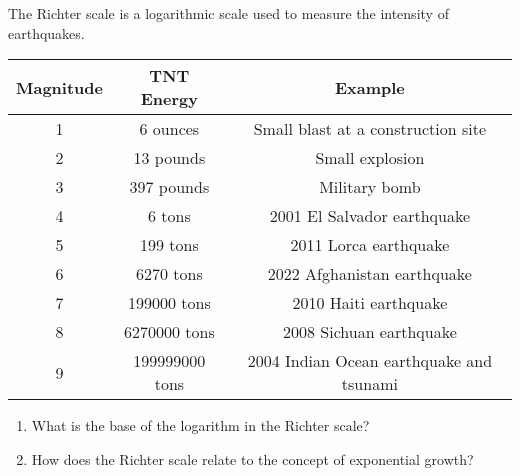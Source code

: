 \documentclass[noauthor,nooutcomes,handout,hints,12pt]{ximera}
\begin{document}
\begin{question}
The Richter scale is a logarithmic scale used to measure the
intensity of earthquakes.
\begin{center}%
    \begin{tabular}{|c|c|c|}\hline
        \textbf{Magnitude} & \textbf{TNT Energy} & \textbf{Example}                   \\\hline
        1                  & 6 ounces            & Small blast at a construction site \\\hline
        2                  & 13 pounds           & Small explosion                    \\\hline
        3                  & 397 pounds          & Military bomb                      \\\hline
        4                  & 6 tons              & 2001 El Salvador earthquake        \\\hline
        5                  & 199 tons            & 2011 Lorca earthquake              \\\hline
        6                  & 6270 tons           & 2022 Afghanistan earthquake        \\\hline
        7                  & 199000 tons         & 2010 Haiti earthquake              \\\hline
        8                  & 6270000 tons        & 2008 Sichuan earthquake            \\\hline
        9                  & 199999000 tons      & 2004 Indian Ocean earthquake and
        tsunami                                                                       \\\hline
    \end{tabular}
\end{center}
\begin{enumerate}
    \item What is the base of the logarithm in the Richter scale?
    \item How does the Richter scale relate to the concept of exponential
          growth?
\end{enumerate}
\end{question}
\end{document}
